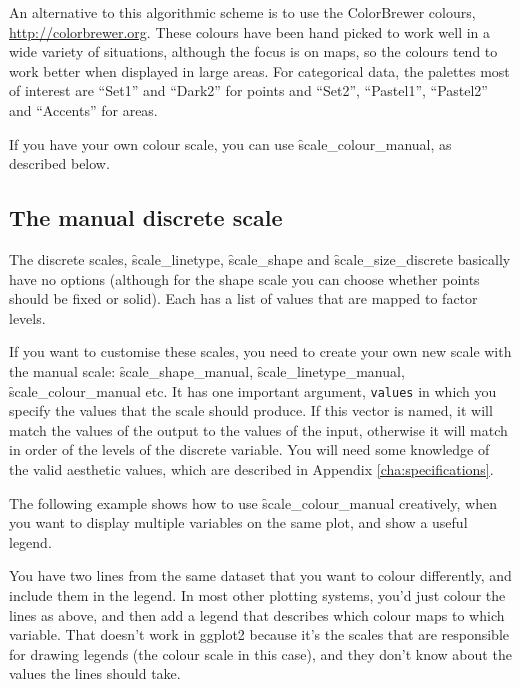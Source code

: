 An alternative to this algorithmic scheme is to use the ColorBrewer colours, \url{http://colorbrewer.org}.  These colours have been hand picked to work well in a wide variety of situations, although the focus is on maps, so the colours tend to work better when displayed in large areas.  For categorical data, the palettes most of interest are ``Set1'' and ``Dark2'' for points and ``Set2'', ``Pastel1'', ``Pastel2'' and ``Accents'' for areas.  

If you have your own colour scale, you can use \f{scale_colour_manual}, as described below.

\subsection{The manual discrete scale}
\label{sub:scale-discrete}

The discrete scales, \f{scale_linetype}, \f{scale_shape} and \f{scale_size_discrete} basically have no options (although for the shape scale you can choose whether points should be fixed or solid). Each has a list of values that are mapped to factor levels.

If you want to customise these scales, you need to create your own new scale with the manual scale: \f{scale_shape_manual}, \f{scale_linetype_manual}, \f{scale_colour_manual} etc.  It has one important argument, \verb|values| in which you specify the values that the scale should produce.  If this vector is named, it will match the values of the output to the values of the input, otherwise it will match in order of the levels of the discrete variable.   You will need some knowledge of the valid aesthetic values, which are described in Appendix \ref{cha:specifications}.

The following example shows how to use \f{scale_colour_manual} creatively, when you want to display multiple variables on the same plot, and show a useful legend.  

% 


You have two lines from the same dataset that you want to colour differently, and include them in the legend.  In most other plotting systems, you'd just colour the lines as above, and then add a legend that describes which colour maps to which variable.  That doesn't work in ggplot2 because it's the scales that are responsible for drawing legends (the colour scale in this case), and they don't know about the values the lines should take.

